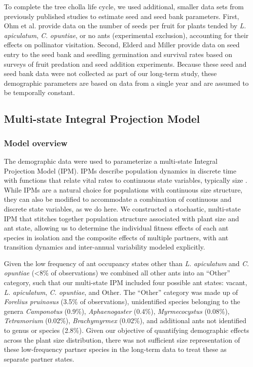 \documentclass[11pt]{article}
\begin{document}
{To complete the tree cholla life cycle, we used additional, smaller data sets from previously published studies to estimate seed and seed bank parameters. 
First, Ohm et al. \citeyear{Ohm2014} provide data on the number of seeds per fruit for plants tended by \textit{L. apiculatum}, \textit{C. opuntiae}, or no ants (experimental exclusion), accounting for their effects on pollinator visitation. 
Second, Elderd and Miller \citeyear{elderd2016quantifying} provide data on seed entry to the seed bank and seedling germination and survival rates based on surveys of fruit predation and seed addition experiments. 
Because these seed and seed bank data were not collected as part of our long-term study, these demographic parameters are based on data from a single year and are assumed to be temporally constant. }

\subsection*{Multi-state Integral Projection Model}
\subsubsection*{Model overview}
The demographic data were used to parameterize a multi-state Integral Projection Model (IPM).
IPMs describe population dynamics in discrete time with functions that relate vital rates to continuous state variables, typically size \citep{ellnerbook}. 
While IPMs are a natural choice for populations with continuous size structure, they can also be modified to accommodate a combination of continuous and discrete state variables, as we do here. 
We constructed a stochastic, multi-state IPM that stitches together population structure associated with plant size and ant state, allowing us to determine the individual fitness effects of each ant species in isolation and the composite effects of multiple partners, with ant transition dynamics and inter-annual variability modeled explicitly.  

Given the low frequency of ant occupancy states other than \textit{L. apiculatum} and \textit{C. opuntiae} (\textless8\% of observations) we combined all other ants into an ``Other'' category, such that our multi-state IPM included four possible ant states: vacant, \textit{L. apiculatum}, \textit{C. opuntiae}, and Other. 
The ``Other'' category was made up of \textit{Forelius pruinosus} (3.5\% of observations), unidentified species belonging to the genera \textit{Camponotus} (0.9\%), \textit{Aphaenogaster} (0.4\%), \textit{Myrmecocystus} (0.08\%), \textit{Tetramorium} (0.02\%), \textit{Brachymyrmex} (0.02\%), and additional ants not identified to genus or species (2.8\%). 
Given our objective of quantifying demographic effects across the plant size distribution, there was not sufficient size representation of these low-frequency partner species in the long-term data to treat these as separate partner states.  
\end{document}
